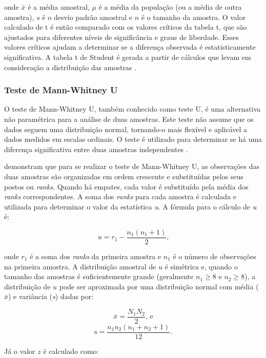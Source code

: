 \noindent
onde \(\bar{x}\) é a média amostral, \(\mu\) é a média da população (ou a média de outra amostra), \(s\) é o desvio padrão amostral e \(n\) é o tamanho da amostra. O valor calculado de t é então comparado com os valores críticos da tabela t, que são ajustados para diferentes níveis de significância e graus de liberdade. Esses valores críticos ajudam a determinar se a diferença observada é estatisticamente significativa. A tabela t de Student é gerada a partir de cálculos que levam em consideração a distribuição das amostras \cite{juristo_basics_2001}.




\subsubsection{Teste de Mann-Whitney U}
\label{subsec:u-test}

O teste de Mann-Whitney U, também conhecido como teste U, é uma alternativa não paramétrica para a análise de duas amostras. Este teste não assume que os dados seguem uma distribuição normal, tornando-o mais flexível e aplicável a dados medidos em escalas ordinais. O teste é utilizado para determinar se há uma diferença significativa entre duas amostras independentes \cite{wohlin_experimentation_2012}.

 demonstram que para se realizar o teste de Mann-Whitney U, as observações das duas amostras são organizadas em ordem crescente e substituídas pelos seus postos ou \textit{ranks}. Quando há empates, cada valor é substituído pela média dos \textit{ranks} correspondentes. A soma dos \textit{ranks} para cada amostra é calculada e utilizada para determinar o valor da estatística \textit{u}. A fórmula para o cálculo de \textit{u} é:

\[
u = r_1 - \frac{n_1 (n_1 + 1)}{2} \text{,}
\]

\noindent
onde \(r_1\) é a soma dos \textit{ranks} da primeira amostra e \(n_1\) é o número de observações na primeira amostra. A distribuição amostral de \(u\) é simétrica e, quando o tamanho das amostras é suficientemente grande (geralmente \(n_1 \geq 8\) e \(n_2 \geq 8\)), a distribuição de \(u\) pode ser aproximada por uma distribuição normal com média (\(\bar{x}\)) e variância (\textit{s}) dadas por:

\[
\bar{x} = \frac{N_1 N_2}{2} \text{, e}
\]
\[
\text{s} = \frac{n_1 n_2 (n_1 + n_2 + 1)}{12} \text{.}
\]

Já o valor \(z\) é calculado como:

